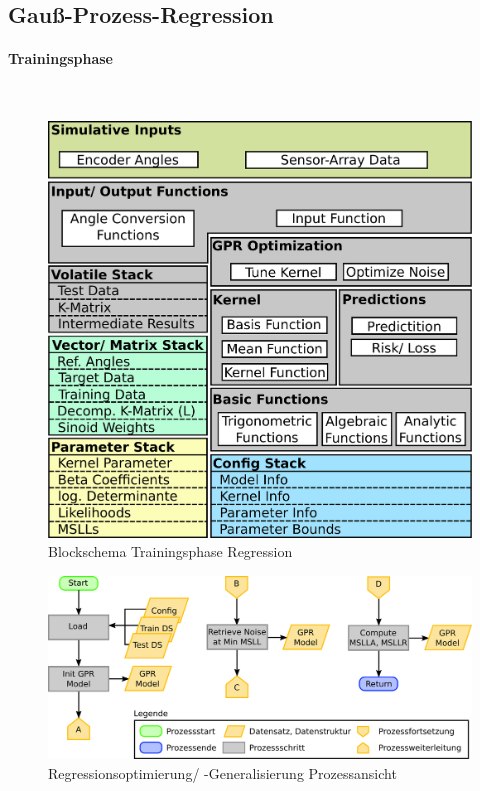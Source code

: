 \clearpage


\subsection{Gauß-Prozess-Regression}\label{sub:gpr-pro}


\paragraph{Trainingsphase}\label{par:gpr-training-pro}$~$\\


\begin{figure}[tbph]
	\centering
	\includegraphics[width=0.7\linewidth]{chapters/images/3-SW-E-OExp/Blockschema_Trainingsphase}
	\caption[Blockschema Trainingsphase Regression]{Blockschema Trainingsphase Regression}
	\label{fig:blockschematrainingsphase}
\end{figure}


\clearpage


\begin{figure}[tbph]
	\centering
	\includegraphics[width=.8\linewidth]{chapters/images/3-SW-E-OExp/GPR_Optimization}
	\caption[Regressionsoptimierung/ -Generalisierung Prozessansicht]{Regressionsoptimierung/ -Generalisierung Prozessansicht}
	\label{fig:gproptimization}
\end{figure}


